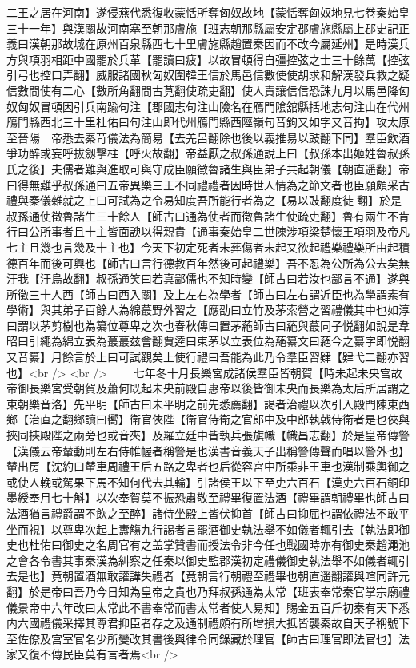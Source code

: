 二王之居在河南】遂侵燕代悉復收蒙恬所奪匈奴故地【蒙恬奪匈奴地見七卷秦始皇三十一年】與漢關故河南塞至朝那膚施【班志朝那縣屬安定郡膚施縣屬上郡史記正義曰漢朝那故城在原州百泉縣西七十里膚施縣趙置秦因而不改今屬延州】是時漢兵方與項羽相距中國罷於兵革【罷讀曰疲】以故冒頓得自彊控弦之士三十餘萬【控弦引弓也控口弄翻】威服諸國秋匈奴圍韓王信於馬邑信數使使胡求和解漢發兵救之疑信數間使有二心【數所角翻間古莧翻使疏吏翻】使人責讓信信恐誅九月以馬邑降匈奴匈奴冒頓因引兵南踰句注【郡國志句注山險名在鴈門隂舘縣括地志句注山在代州鴈門縣西北三十里杜佑曰句注山即代州鴈門縣西陘嶺句音鉤又如字又音拘】攻太原至晉陽　帝悉去秦苛儀法為簡易【去羌呂翻除也後以義推易以豉翻下同】羣臣飲酒爭功醉或妄呼拔劔擊柱【呼火故翻】帝益厭之叔孫通說上曰【叔孫本出姬姓魯叔孫氏之後】夫儒者難與進取可與守成臣願徵魯諸生與臣弟子共起朝儀【朝直遥翻】帝曰得無難乎叔孫通曰五帝異樂三王不同禮禮者因時世人情為之節文者也臣願頗采古禮與秦儀雜就之上曰可試為之令易知度吾所能行者為之【易以豉翻度徒翻】於是叔孫通使徵魯諸生三十餘人【師古曰通為使者而徵魯諸生使疏吏翻】魯有兩生不肯行曰公所事者且十主皆面諛以得親貴【通事秦始皇二世陳涉項梁楚懷王項羽及帝凡七主且幾也言幾及十主也】今天下初定死者未葬傷者未起又欲起禮樂禮樂所由起積德百年而後可興也【師古曰言行德教百年然後可起禮樂】吾不忍為公所為公去矣無汙我【汙烏故翻】叔孫通笑曰若真鄙儒也不知時變【師古曰若汝也鄙言不通】遂與所徵三十人西【師古曰西入關】及上左右為學者【師古曰左右謂近臣也為學謂素有學術】與其弟子百餘人為綿蕞野外習之【應劭曰立竹及茅索營之習禮儀其中也如淳曰謂以茅剪樹也為纂位尊卑之次也春秋傳曰置茅蕝師古曰蕝與蕞同子悦翻如說是韋昭曰引繩為綿立表為蕞蕞兹會翻賈逵曰束茅以立表位為蕝纂文曰蕝今之纂字即悦翻又音纂】月餘言於上曰可試觀矣上使行禮曰吾能為此乃令羣臣習肄【肄弋二翻亦習也】<br />
<br />
　　七年冬十月長樂宮成諸侯羣臣皆朝賀【時未起未央宫故帝御長樂宮受朝賀及蕭何既起未央前殿自惠帝以後皆御未央而長樂為太后所居謂之東朝樂音洛】先平明【師古曰未平明之前先悉薦翻】謁者治禮以次引入殿門陳東西鄉【治直之翻鄉讀曰嚮】衛官俠陛【衛官侍衛之官郎中及中郎執戟侍衛者是也俠與挾同挾殿陛之兩旁也或音夾】及羅立廷中皆執兵張旗幟【幟昌志翻】於是皇帝傳警【漢儀云帝輦動則左右侍帷幄者稱警是也漢書音義天子出稱警傳聲而唱以警外也】輦出房【沈約曰輦車周禮王后五路之卑者也后從容宮中所乘非王車也漢制乘輿御之或使人輓或駕果下馬不知何代去其輪】引諸侯王以下至吏六百石【漢吏六百石銅印墨綬奉月七十斛】以次奉賀莫不振恐肅敬至禮畢復置法酒【禮畢謂朝禮畢也師古曰法酒猶言禮爵謂不飲之至醉】諸侍坐殿上皆伏抑首【師古曰抑屈也謂依禮法不敢平坐而視】以尊卑次起上夀觴九行謁者言罷酒御史執法舉不如儀者輒引去【執法即御史也杜佑曰御史之名周官有之盖掌贊書而授法令非今任也戰國時亦有御史秦趙澠池之會各令書其事秦漢為糾察之任秦以御史監郡漢初定禮儀御史執法舉不如儀者輒引去是也】竟朝置酒無敢讙譁失禮者【竟朝言行朝禮至禮畢也朝直遥翻讙與喧同許元翻】於是帝曰吾乃今日知為皇帝之貴也乃拜叔孫通為太常【班表奉常秦官掌宗廟禮儀景帝中六年改曰太常此不書奉常而書太常者使人易知】賜金五百斤初秦有天下悉内六國禮儀采擇其尊君抑臣者存之及通制禮頗有所增損大抵皆襲秦故自天子稱號下至佐僚及宫室官名少所變改其書後與律令同錄藏於理官【師古曰理官即法官也】法家又復不傳民臣莫有言者焉<br />
